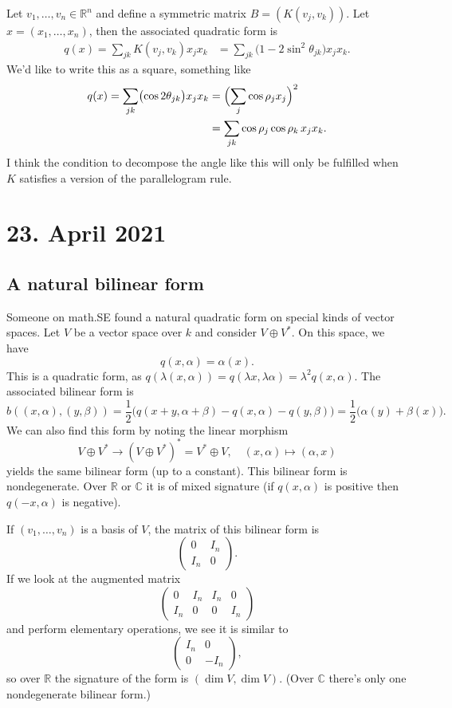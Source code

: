 \documentclass[11pt]{article}
\theoremstyle{definition}
\newcommand{\kk}[1]{\mathbb{#1}}
\begin{document}
Let $v_1, \ldots, v_n \in \kk R^n$ and define a symmetric matrix $B = (K(v_j, v_k))$. Let $x = (x_1, \ldots, x_n)$, then the associated quadratic form is
\begin{align*}
q(x)
= \sum_{jk} K(v_j, v_k) x_j x_k
&= \sum_{jk} \bigl(
1 - 2 \sin^2 \theta_{jk}
\bigr) x_j x_k.
\end{align*}
We'd like to write this as a square, something like
\begin{align*}
q(x) = \sum_{jk} \bigl(\cos 2\theta_{jk} \bigr) x_j x_k
&= \Bigl(\sum_{j} \cos \rho_jx_j \Bigr)^2
\\
&= \sum_{jk} \cos \rho_j\cos \rho_k \, x_j x_k.
\end{align*}
I think the condition to decompose the angle like this will only be fulfilled when $K$ satisfies a version of the parallelogram rule.


\section*{23. April 2021}

\subsection*{A natural bilinear form}

Someone on math.SE found a natural quadratic form on special kinds of vector spaces. Let $V$ be a vector space over $k$ and consider $V \oplus V^*$. On this space, we have
\[
q(x, \alpha) = \alpha(x).
\]
This is a quadratic form, as $q(\lambda(x,\alpha)) = q(\lambda x, \lambda\alpha) = \lambda^2 q(x, \alpha)$. The associated bilinear form is
\[
b((x, \alpha), (y, \beta))
= \frac12\bigl(q(x + y, \alpha + \beta) - q(x, \alpha) - q(y,\beta)\bigr)
= \frac12 \bigl(\alpha(y) + \beta(x)\bigr).
\]
We can also find this form by noting the linear morphism
\[
V \oplus V^* \to (V \oplus V^*)^* = V^* \oplus V,
\quad
(x, \alpha) \mapsto (\alpha, x)
\]
yields the same bilinear form (up to a constant). This bilinear form is
nondegenerate. Over $\kk R$ or $\kk C$ it is of mixed signature (if
$q(x,\alpha)$ is positive then $q(-x,\alpha)$ is negative).

If $(v_1, \ldots, v_n)$ is a basis of $V$, the matrix of this bilinear form is
\[
\begin{pmatrix}
0 & I_n \\
I_n & 0
\end{pmatrix}.
\]
If we look at the augmented matrix
\[
\begin{pmatrix}
0 & I_n & I_n & 0 \\
I_n & 0 & 0 & I_n
\end{pmatrix}
\]
and perform elementary operations, we see it is similar to
\[
\begin{pmatrix}
I_n & 0 \\
0 & -I_n
\end{pmatrix},
\]
so over $\kk R$ the signature of the form is $(\dim V, \dim V)$. (Over $\kk C$ there's only one nondegenerate bilinear form.)
\end{document}
